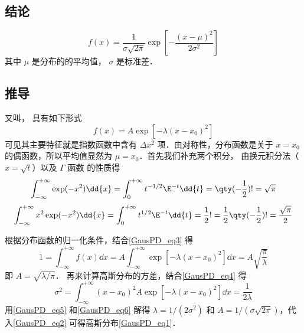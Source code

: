 
\subsection{结论}
\begin{equation}\label{GausPD_eq1}
f(x) = \frac{1}{\sigma \sqrt{2\pi }} \exp[-\frac{(x - \mu )^2}{2\sigma ^2}]
\end{equation}
其中 $\mu$ 是分布的的平均值， $\sigma$ 是标准差．

\subsection{推导}
又叫， 具有如下形式
\begin{equation}\label{GausPD_eq2}
f(x) = A\exp[-\lambda (x - x_0)^2]
\end{equation}
可见其主要特征就是指数函数中含有 $\Delta x^2$ 项．由对称性，分布函数是关于 $x =x_0$ 的偶函数，所以平均值显然为 $\mu = x_0$．首先我们补充两个积分， 由换元积分法（$x=\sqrt{t}$）以及 $\Gamma$ 函数 的性质得
\begin{equation}\label{GausPD_eq3}
\int_{-\infty }^{+\infty } \exp (-x^2)\dd{x}  = \int_0^{+\infty} t^{-1/2}\E^{ - t} \dd{t}  = \qty(-\frac12)! = \sqrt \pi 
\end{equation}
\begin{equation}\label{GausPD_eq4}
\int_{-\infty}^{+\infty} x^2\exp(-x^2)\dd{x}  = \int_0^{+\infty} t^{1/2}\E^{-t} \dd{t}  = \frac12 ! = \frac12 \qty(-\frac12)! = \frac{\sqrt\pi}{2}
\end{equation}

根据分布函数的归一化条件，结合\autoref{GausPD_eq3} 得
\begin{equation}\label{GausPD_eq5}
1 = \int_{-\infty}^{+\infty} f(x) \dd{x}  = A\int_{-\infty}^{+\infty} \exp[-\lambda (x - x_0)^2] \dd{x}  = A\sqrt{\frac{\pi}{\lambda}}
\end{equation}
即 $A = \sqrt{\lambda/\pi}$． 再来计算高斯分布的方差，结合\autoref{GausPD_eq4} 得
\begin{equation}\label{GausPD_eq6}
\sigma ^2 = \int_{-\infty}^{+\infty} (x - x_0)^2 A\exp[-\lambda (x - x_0)^2] \dd{x}  = \frac{1}{2\lambda}
\end{equation}
用\autoref{GausPD_eq5} 和\autoref{GausPD_eq6} 解得 $\lambda = 1/(2\sigma^2)$ 和 $A = 1/(\sigma\sqrt{2\pi})$，代入\autoref{GausPD_eq2} 可得高斯分布\autoref{GausPD_eq1}．